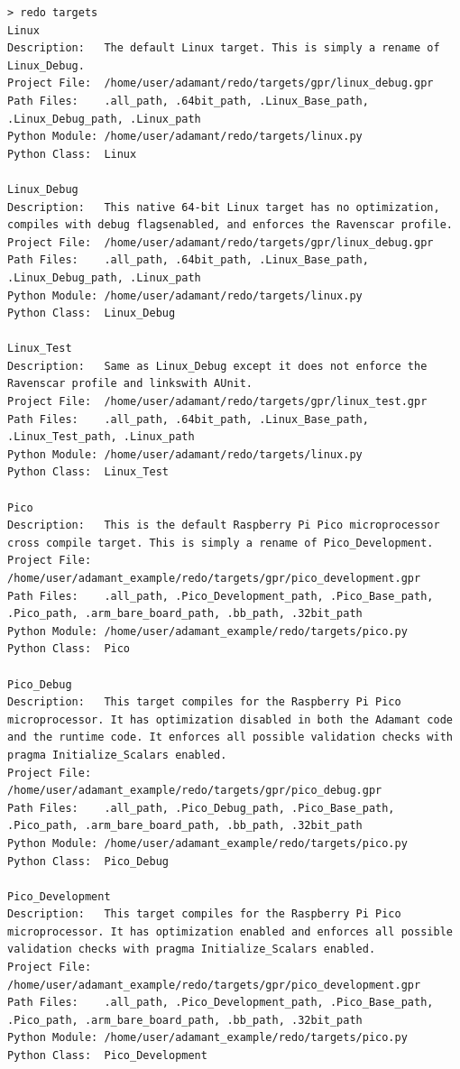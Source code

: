 \vspace{5mm} %
\begin{verbatim}
> redo targets
Linux
Description:   The default Linux target. This is simply a rename of Linux_Debug.
Project File:  /home/user/adamant/redo/targets/gpr/linux_debug.gpr
Path Files:    .all_path, .64bit_path, .Linux_Base_path, .Linux_Debug_path, .Linux_path
Python Module: /home/user/adamant/redo/targets/linux.py
Python Class:  Linux

Linux_Debug
Description:   This native 64-bit Linux target has no optimization, compiles with debug flagsenabled, and enforces the Ravenscar profile.
Project File:  /home/user/adamant/redo/targets/gpr/linux_debug.gpr
Path Files:    .all_path, .64bit_path, .Linux_Base_path, .Linux_Debug_path, .Linux_path
Python Module: /home/user/adamant/redo/targets/linux.py
Python Class:  Linux_Debug

Linux_Test
Description:   Same as Linux_Debug except it does not enforce the Ravenscar profile and linkswith AUnit.
Project File:  /home/user/adamant/redo/targets/gpr/linux_test.gpr
Path Files:    .all_path, .64bit_path, .Linux_Base_path, .Linux_Test_path, .Linux_path
Python Module: /home/user/adamant/redo/targets/linux.py
Python Class:  Linux_Test

Pico
Description:   This is the default Raspberry Pi Pico microprocessor cross compile target. This is simply a rename of Pico_Development.
Project File:  /home/user/adamant_example/redo/targets/gpr/pico_development.gpr
Path Files:    .all_path, .Pico_Development_path, .Pico_Base_path, .Pico_path, .arm_bare_board_path, .bb_path, .32bit_path
Python Module: /home/user/adamant_example/redo/targets/pico.py
Python Class:  Pico

Pico_Debug
Description:   This target compiles for the Raspberry Pi Pico microprocessor. It has optimization disabled in both the Adamant code and the runtime code. It enforces all possible validation checks with pragma Initialize_Scalars enabled.
Project File:  /home/user/adamant_example/redo/targets/gpr/pico_debug.gpr
Path Files:    .all_path, .Pico_Debug_path, .Pico_Base_path, .Pico_path, .arm_bare_board_path, .bb_path, .32bit_path
Python Module: /home/user/adamant_example/redo/targets/pico.py
Python Class:  Pico_Debug

Pico_Development
Description:   This target compiles for the Raspberry Pi Pico microprocessor. It has optimization enabled and enforces all possible validation checks with pragma Initialize_Scalars enabled.
Project File:  /home/user/adamant_example/redo/targets/gpr/pico_development.gpr
Path Files:    .all_path, .Pico_Development_path, .Pico_Base_path, .Pico_path, .arm_bare_board_path, .bb_path, .32bit_path
Python Module: /home/user/adamant_example/redo/targets/pico.py
Python Class:  Pico_Development


\end{verbatim}

